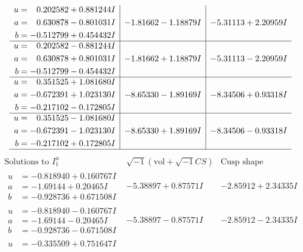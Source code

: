 \documentclass[1p]{elsarticle_modified}
\theoremstyle{definition}
\newcommand{\I}{\sqrt{-1}}
\begin{document}
$$\begin{array}{c|c|c}
\begin{aligned}
u &= \phantom{-}0.202582 + 0.881244 I \\
a &= \phantom{-}0.630878 - 0.801031 I \\
b &= -0.512799 + 0.454432 I\end{aligned}
 & -1.81662 - 1.18879 I & -5.31113 + 2.20959 I \\ \hline\begin{aligned}
u &= \phantom{-}0.202582 - 0.881244 I \\
a &= \phantom{-}0.630878 + 0.801031 I \\
b &= -0.512799 - 0.454432 I\end{aligned}
 & -1.81662 + 1.18879 I & -5.31113 - 2.20959 I \\ \hline\begin{aligned}
u &= \phantom{-}0.351525 + 1.081680 I \\
a &= -0.672391 + 1.023130 I \\
b &= -0.217102 - 0.172805 I\end{aligned}
 & -8.65330 - 1.89169 I & -8.34506 + 0.93318 I \\ \hline\begin{aligned}
u &= \phantom{-}0.351525 - 1.081680 I \\
a &= -0.672391 - 1.023130 I \\
b &= -0.217102 + 0.172805 I\end{aligned}
 & -8.65330 + 1.89169 I & -8.34506 - 0.93318 I\\
 \hline 
 \end{array}$$\newpage$$\begin{array}{c|c|c}  
\text{Solutions to }I^u_{1}& \I (\text{vol} + \sqrt{-1}CS) & \text{Cusp shape}\\
 \hline 
\begin{aligned}
u &= -0.818940 + 0.160767 I \\
a &= -1.69144 + 0.20465 I \\
b &= -0.928736 + 0.671508 I\end{aligned}
 & -5.38897 + 0.87571 I & -2.85912 + 2.34335 I \\ \hline\begin{aligned}
u &= -0.818940 - 0.160767 I \\
a &= -1.69144 - 0.20465 I \\
b &= -0.928736 - 0.671508 I\end{aligned}
 & -5.38897 - 0.87571 I & -2.85912 - 2.34335 I \\ \hline\begin{aligned}
u &= -0.335509 + 0.751647 I \\

\end{aligned}
\end{array}$$
\end{document}
